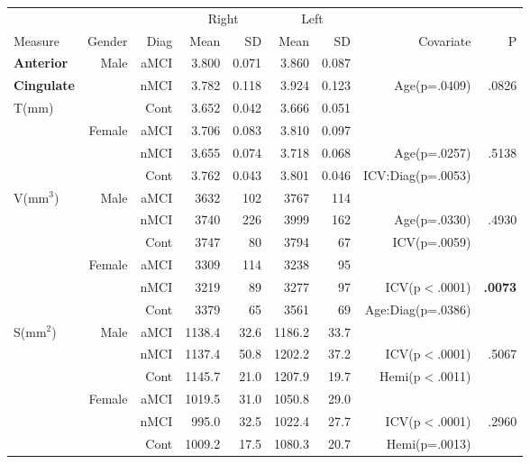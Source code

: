 \documentclass[12pt]{article}\usepackage[]{graphicx}\usepackage[]{color}
\newcommand\T{\rule{0pt}{2.6ex}}
\newcommand\B{\rule[-1.2ex]{0pt}{0pt}}
\begin{document}
\newpage
\begin{table}[p]
	\centering
	\footnotesize
	\begin{tabular}{l|rr|rrrr|rr}
	\hline
	& & & \multicolumn{2}{c}{Right} \T & \multicolumn{2}{c|}{Left} & & \\
	\multicolumn{1}{l|}{Measure} \T\B & Gender & Diag & Mean & SD & Mean & SD & Covariate & P \\
	\hline\hline
	\textbf{Anterior} & \multirow{3}{*}{Male} & aMCI\T & 3.800 & 0.071 & 3.860 & 0.087 & & \\
	\textbf{Cingulate}						&						& nMCI & 3.782 & 0.118 & 3.924 & 0.123 & Age(p=.0409) & .0826 \\
	\multirow{2}{*}{T(mm)}						&						& Cont & 3.652 & 0.042 & 3.666 & 0.051 & & \\ \cline{2-9}						
							&	\multirow{3}{*}{Female}	& aMCI\T & 3.706 & 0.083 & 3.810 & 0.097 & & \\
							&						& nMCI & 3.655 & 0.074 & 3.718 & 0.068 & Age(p=.0257) & .5138 \\
							&						& Cont & 3.762 & 0.043 & 3.801 & 0.046 & ICV:Diag(p=.0053) & \\
	\hline
	\multirow{6}{*}{V(mm$^3$)} & \multirow{3}{*}{Male} & aMCI\T & 3632 & 102 & 3767 & 114 & &   \\
							&						& nMCI & 3740 & 226 & 3999 & 162 & Age(p=.0330) & .4930 \\
							&						& Cont & 3747 & 80 & 3794 & 67 & ICV(p=.0059) & \\\cline{2-9}
							&	\multirow{3}{*}{Female}	& aMCI\T & 3309 & 114 & 3238 & 95 & & \\
							&						& nMCI & 3219 & 89 & 3277 & 97 & ICV(p$<$.0001) & \textbf{.0073}\\
							&						& Cont & 3379 & 65 & 3561 & 69 & Age:Diag(p=.0386) & \\
	\hline
	\multirow{6}{*}{S(mm$^2$)} & \multirow{3}{*}{Male} & aMCI\T & 1138.4 & 32.6 & 1186.2 & 33.7 & & \\
							&						& nMCI & 1137.4 & 50.8 & 1202.2 & 37.2 &  ICV(p$<$.0001) & .5067 \\
							&						& Cont & 1145.7 & 21.0 & 1207.9 & 19.7 & Hemi(p$<$.0011) & \\\cline{2-9}
							&	\multirow{3}{*}{Female}	& aMCI\T & 1019.5 & 31.0 & 1050.8 & 29.0 & &\\
							&						& nMCI & 995.0 & 32.5 & 1022.4 & 27.7 & ICV(p$<$.0001) & .2960\\
							&						& Cont & 1009.2 & 17.5 & 1080.3 & 20.7 & Hemi(p=.0013) & \\

\end{tabular}
\end{table}
\end{document}
